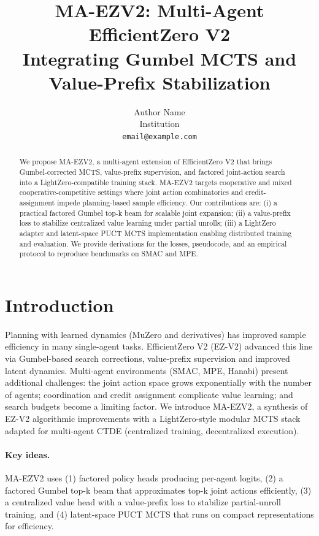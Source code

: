 \documentclass{article}
\title{MA-EZV2: Multi-Agent EfficientZero V2 \\ Integrating Gumbel MCTS and Value-Prefix Stabilization}
\author{Author Name \\ Institution \\ \texttt{email@example.com}}
\date{}
\begin{document}
\maketitle

\begin{abstract}
We propose MA-EZV2, a multi-agent extension of EfficientZero V2 that brings Gumbel-corrected MCTS, value-prefix supervision, and factored joint-action search into a LightZero-compatible training stack. MA-EZV2 targets cooperative and mixed cooperative-competitive settings where joint action combinatorics and credit-assignment impede planning-based sample efficiency. Our contributions are: (i) a practical factored Gumbel top-k beam for scalable joint expansion; (ii) a value-prefix loss to stabilize centralized value learning under partial unrolls; (iii) a LightZero adapter and latent-space PUCT MCTS implementation enabling distributed training and evaluation. We provide derivations for the losses, pseudocode, and an empirical protocol to reproduce benchmarks on SMAC and MPE.
\end{abstract}

\section{Introduction}
Planning with learned dynamics (MuZero and derivatives) has improved sample efficiency in many single-agent tasks. EfficientZero V2 (EZ-V2) advanced this line via Gumbel-based search corrections, value-prefix supervision and improved latent dynamics. Multi-agent environments (SMAC, MPE, Hanabi) present additional challenges: the joint action space grows exponentially with the number of agents; coordination and credit assignment complicate value learning; and search budgets become a limiting factor. We introduce MA-EZV2, a synthesis of EZ-V2 algorithmic improvements with a LightZero-style modular MCTS stack adapted for multi-agent CTDE (centralized training, decentralized execution).

\paragraph{Key ideas.} MA-EZV2 uses (1) factored policy heads producing per-agent logits, (2) a factored Gumbel top-k beam that approximates top-k joint actions efficiently, (3) a centralized value head with a value-prefix loss to stabilize partial-unroll training, and (4) latent-space PUCT MCTS that runs on compact representations for efficiency.
\end{document}
